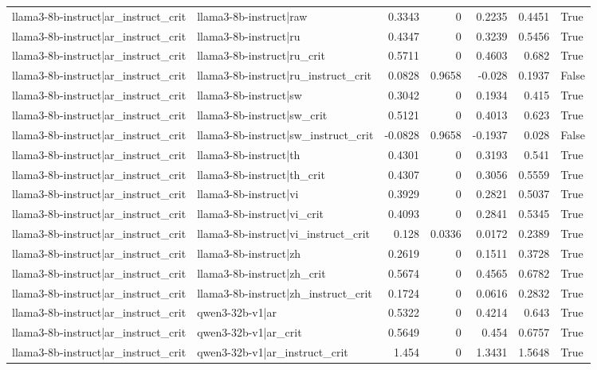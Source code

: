 \begin{table}
\begin{tabular}{l l r r r r l}
llama3-8b-instruct|ar_instruct_crit & llama3-8b-instruct|raw & 0.3343 & 0 & 0.2235 & 0.4451 & True \\
llama3-8b-instruct|ar_instruct_crit & llama3-8b-instruct|ru & 0.4347 & 0 & 0.3239 & 0.5456 & True \\
llama3-8b-instruct|ar_instruct_crit & llama3-8b-instruct|ru_crit & 0.5711 & 0 & 0.4603 & 0.682 & True \\
llama3-8b-instruct|ar_instruct_crit & llama3-8b-instruct|ru_instruct_crit & 0.0828 & 0.9658 & -0.028 & 0.1937 & False \\
llama3-8b-instruct|ar_instruct_crit & llama3-8b-instruct|sw & 0.3042 & 0 & 0.1934 & 0.415 & True \\
llama3-8b-instruct|ar_instruct_crit & llama3-8b-instruct|sw_crit & 0.5121 & 0 & 0.4013 & 0.623 & True \\
llama3-8b-instruct|ar_instruct_crit & llama3-8b-instruct|sw_instruct_crit & -0.0828 & 0.9658 & -0.1937 & 0.028 & False \\
llama3-8b-instruct|ar_instruct_crit & llama3-8b-instruct|th & 0.4301 & 0 & 0.3193 & 0.541 & True \\
llama3-8b-instruct|ar_instruct_crit & llama3-8b-instruct|th_crit & 0.4307 & 0 & 0.3056 & 0.5559 & True \\
llama3-8b-instruct|ar_instruct_crit & llama3-8b-instruct|vi & 0.3929 & 0 & 0.2821 & 0.5037 & True \\
llama3-8b-instruct|ar_instruct_crit & llama3-8b-instruct|vi_crit & 0.4093 & 0 & 0.2841 & 0.5345 & True \\
llama3-8b-instruct|ar_instruct_crit & llama3-8b-instruct|vi_instruct_crit & 0.128 & 0.0336 & 0.0172 & 0.2389 & True \\
llama3-8b-instruct|ar_instruct_crit & llama3-8b-instruct|zh & 0.2619 & 0 & 0.1511 & 0.3728 & True \\
llama3-8b-instruct|ar_instruct_crit & llama3-8b-instruct|zh_crit & 0.5674 & 0 & 0.4565 & 0.6782 & True \\
llama3-8b-instruct|ar_instruct_crit & llama3-8b-instruct|zh_instruct_crit & 0.1724 & 0 & 0.0616 & 0.2832 & True \\
llama3-8b-instruct|ar_instruct_crit & qwen3-32b-v1|ar & 0.5322 & 0 & 0.4214 & 0.643 & True \\
llama3-8b-instruct|ar_instruct_crit & qwen3-32b-v1|ar_crit & 0.5649 & 0 & 0.454 & 0.6757 & True \\
llama3-8b-instruct|ar_instruct_crit & qwen3-32b-v1|ar_instruct_crit & 1.454 & 0 & 1.3431 & 1.5648 & True \\

\end{tabular}
\end{table}
